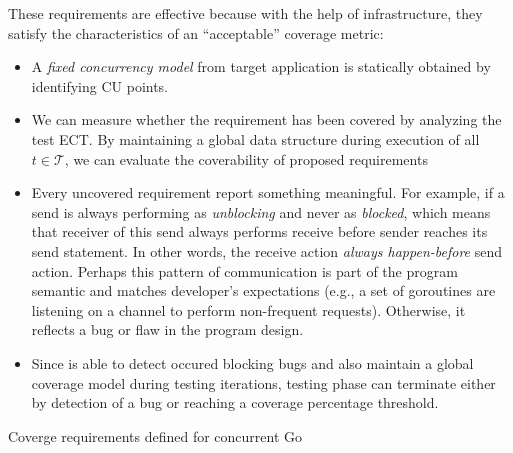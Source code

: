 These requirements are effective because with the help of \goat infrastructure, they satisfy the characteristics of an ``acceptable'' coverage metric:
\begin{itemize}
  \item A \textit{fixed concurrency model} from target application is statically obtained by identifying CU points.
  \item We can measure whether the requirement has been covered by analyzing the test ECT. By maintaining a global data structure during execution of all $t \in \mathcal{T}$, we can evaluate the coverability of proposed requirements
  \item Every uncovered requirement report something meaningful. For example, if a send is always performing as \textit{unblocking} and never as \textit{blocked}, which means that receiver of this send always performs receive before sender reaches its send statement. In other words, the receive action \textit{always happen-before} send action. Perhaps this pattern of communication is part of the program semantic and matches developer's expectations (e.g., a set of goroutines are listening on a channel to perform non-frequent requests). Otherwise, it reflects a bug or flaw in the program design.
  \item Since \goat is able to detect occured blocking bugs and also maintain a global coverage model during testing iterations, testing phase can terminate either by detection of a bug or reaching a coverage percentage threshold.
\end{itemize}




\begin{table}[]
\centering
\caption{Coverge requirements defined for concurrent Go}
\scalebox{0.9}{

}
\label{tab:cov_req}
\end{table}




